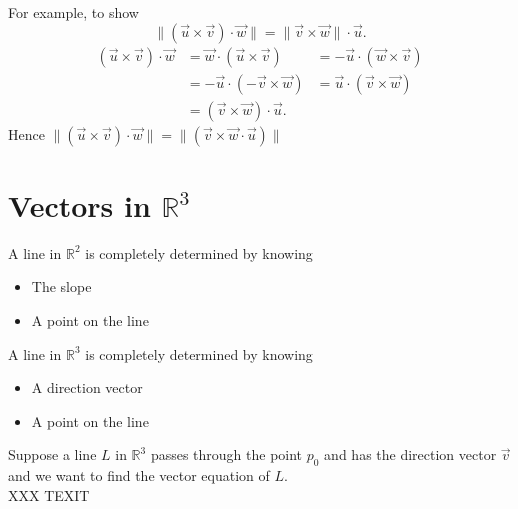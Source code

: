 \documentclass{report}
\begin{document}
  For example, to show 
  \[
  \| \left( \vec{ u} \times  \vec{ v}  \right) \cdot  \vec{ w} \|= \| \vec{ v} \times \vec{w} \| \cdot \vec{ u}
  .\]
  \begin{align*}
    \left( \vec{ u} \times  \vec{ v}  \right) \cdot  \vec{w } &= \vec{ w} \cdot  \left( \vec{ u} \times  \vec{ v}  \right) &= - \vec{ u} \cdot \left( \vec{ w} \times  \vec{ v}  \right)   \\
    &= - \vec{ u} \cdot  \left( - \vec{ v} \times  \vec{ w}  \right) &= \vec{ u} \cdot  \left( \vec{ v} \times  \vec{ w}  \right)   \\
    &= \left( \vec{ v}  \times  \vec{ w}  \right) \cdot  \vec{ u} 
  .\end{align*}
  Hence $ \| \left( \vec{ u} \times  \vec{ v}  \right) \cdot  \vec{ w} \|= \| \left( \vec{ v} \times  \vec{ w} \cdot  \vec{ u}  \right) \|$
  
  \section{Vectors in $\mathbb{R}^3$}
  A line in $\mathbb{R}^2 $ is completely determined by knowing 
\begin{itemize}
        \item The slope
        \item A point on the line
\end{itemize}
A line in $\mathbb{R}^3 $ is completely determined by knowing 
\begin{itemize}
        \item A direction vector
        \item A point on the line
\end{itemize}
Suppose a line $L$ in  $\mathbb{R}^3$ passes through the point $p_0$ and has the direction vector $\vec{v} $and we want to find the vector equation of $L$.\\
XXX TEXIT\\
\end{document}
